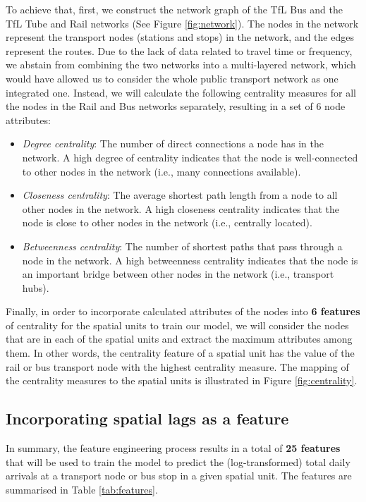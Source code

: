 To achieve that, first, we construct the network graph of the TfL Bus and the TfL Tube and Rail networks (See Figure \ref{fig:network}). The nodes in the network represent the transport nodes (stations and stops) in the network, and the edges represent the routes. Due to the lack of data related to travel time or frequency, we abstain from combining the two networks into a multi-layered network, which would have allowed us to consider the whole public transport network as one integrated one. Instead, we will calculate the following centrality measures for all the nodes in the Rail and Bus networks separately, resulting in a set of 6 node attributes:

\begin{itemize}
    \setlength\itemsep{0em}
    \item \textit{Degree centrality}: The number of direct connections a node has in the network. A high degree of centrality indicates that the node is well-connected to other nodes in the network (i.e., many connections available).
    \item \textit{Closeness centrality}: The average shortest path length from a node to all other nodes in the network. A high closeness centrality indicates that the node is close to other nodes in the network (i.e., centrally located). 
    \item \textit{Betweenness centrality}: The number of shortest paths that pass through a node in the network. A high betweenness centrality indicates that the node is an important bridge between other nodes in the network (i.e., transport hubs).
\end{itemize}

Finally, in order to incorporate calculated attributes of the nodes into \textbf{6 features} of centrality for the spatial units to train our model, we will consider the nodes that are in each of the spatial units and extract the maximum attributes among them. In other words, the centrality feature of a spatial unit has the value of the rail or bus transport node with the highest centrality measure. The mapping of the centrality measures to the spatial units is illustrated in Figure \ref{fig:centrality}.

\subsection{Incorporating spatial lags as a feature}

In summary, the feature engineering process results in a total of \textbf{25 features} that will be used to train the model to predict the (log-transformed) total daily arrivals at a transport node or bus stop in a given spatial unit. The features are summarised in Table \ref{tab:features}.

